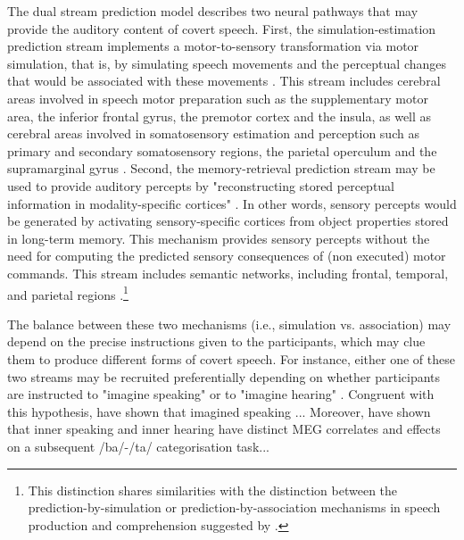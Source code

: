\documentclass[utf8]{template/frontiersSCNS} %
\begin{document}
The dual stream prediction model \citep{tian_mental_2012, tian_effect_2013, tian_mental_2016} describes two neural pathways that may provide the auditory content of covert speech. First, the simulation-estimation prediction stream implements a motor-to-sensory transformation via motor simulation, that is, by simulating speech movements and the perceptual changes that would be associated with these movements \citep[see also][for a similar proposal]{loevenbruck_cognitive_2018}. This stream includes cerebral areas involved in speech motor preparation such as the supplementary motor area, the inferior frontal gyrus, the premotor cortex and the insula, as well as cerebral areas involved in somatosensory estimation and perception such as primary and secondary somatosensory regions, the parietal operculum and the supramarginal gyrus \citep{tian_mental_2016}. Second, the memory-retrieval prediction stream may be used to provide auditory percepts by "reconstructing stored perceptual information in modality-specific cortices" \citep{tian_mental_2016}. In other words, sensory percepts would be generated by activating sensory-specific cortices from object properties stored in long-term memory. This mechanism provides sensory percepts without the need for computing the predicted sensory consequences of (non executed) motor commands. This stream includes semantic networks, including frontal, temporal, and parietal regions \citep{tian_mental_2016}.\footnote{This distinction shares similarities with the distinction between the prediction-by-simulation or prediction-by-association mechanisms in speech production and comprehension suggested by \cite{pickering_integrated_2013}.}

The balance between these two mechanisms (i.e., simulation vs. association) may depend on the precise instructions given to the participants, which may clue them to produce different forms of covert speech. For instance, either one of these two streams may be recruited preferentially depending on whether participants are instructed to "imagine speaking" or to "imagine hearing" \citep[see also the distinction between the "inner ear" and the "inner voice", e.g.,][]{smith_subvocalization_1992}. Congruent with this hypothesis, \cite{tian_mental_2016} have shown that imagined speaking ... Moreover, \cite{ma_distinct_2019} have shown that inner speaking and inner hearing have distinct MEG correlates and effects on a subsequent /ba/-/ta/ categorisation task...
\end{document}
